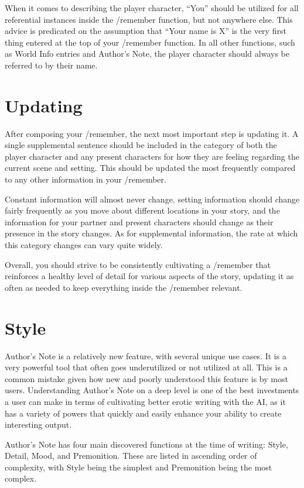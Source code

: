 \documentclass[Source-main.tex]{subfiles}
\begin{document}
When it comes to describing the player character, “You” should be utilized for all referential instances inside the /remember function, but not anywhere else.
This advice is predicated on the assumption that “Your name is X” is the very first thing entered at the top of your /remember function.
In all other functions, such as World Info entries and Author’s Note, the player character should always be referred to by their name.

\section{Updating}

After composing your /remember, the next most important step is updating it.
A single supplemental sentence should be included in the category of both the player character and any present characters for how they are feeling regarding the current scene and setting.
This should be updated the most frequently compared to any other information in your /remember.

Constant information will almost never change, setting information should change fairly frequently as you move about different locations in your story, and the information for your partner and present characters should change as their presence in the story changes.
As for supplemental information, the rate at which this category changes can vary quite widely.

Overall, you should strive to be consistently cultivating a /remember that reinforces a healthy level of detail for various aspects of the story, updating it as often as needed to keep everything inside the /remember relevant.


\section{Style}

Author’s Note is a relatively new feature, with several unique use cases.
It is a very powerful tool that often goes underutilized or not utilized at all.
This is a common mistake given how new and poorly understood this feature is by most users.
Understanding Author’s Note on a deep level is one of the best investments a user can make in terms of cultivating better erotic writing with the AI, as it has a variety of powers that quickly and easily enhance your ability to create interesting output.

Author’s Note has four main discovered functions at the time of writing: Style, Detail, Mood, and Premonition.
These are listed in ascending order of complexity, with Style being the simplest and Premonition being the most complex.
\end{document}
